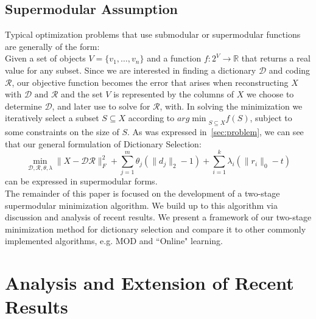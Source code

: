 \documentclass{article}
\newcommand{\R}{\mathbb{R}}
\newcommand{\Rr}{\mathcal{R}}
\newcommand{\D}{\mathcal{D}}
\begin{document}
\subsection{Supermodular Assumption}\label{sec:supermod}

\noindent Typical optimization problems that use submodular or supermodular functions are generally of the form:\\

\noindent Given a set of objects $V=\{v_1,\ldots,v_n\}$ and a function $f:2^V\to \R$ that returns a real value for any subset. Since we are interested in finding a dictionary $\D$ and coding $\Rr$, our objective function becomes the error that arises when reconstructing $X$ with $\D \text{ and } \Rr$ and the set $V$ is represented by the columns of $X$ we choose to determine $\D$, and later use to solve for $\Rr$, with. In solving the minimization we iteratively select a subset $S\subseteq X$ according to ${arg\min}_{S\subseteq X} f(S)$,  subject to some constraints on the size of $S$. As was expressed in~\ref{sec:problem}, we can see that our general formulation of Dictionary Selection:  
$$\min_{\D, \Rr, \theta, \lambda} \|X  -\D\Rr\|_F^2 + \sum_{j=1}^m \theta_j (\| d_j\|_2 - 1)+ \sum_{i=1}^k \lambda_i (\| r_i \|_0 - t)$$
can be expressed in supermodular forms.\\

\noindent The remainder of this paper is focused on the development of a two-stage supermodular minimization algorithm. We build up to this algorithm via discussion and analysis of recent results. We present a framework of our two-stage minimization method for dictionary selection and compare it to other commonly implemented algorithms, e.g. MOD and  ``Online" learning.

\section{Analysis and Extension of Recent Results}\label{sec:recentresults}
\end{document}

